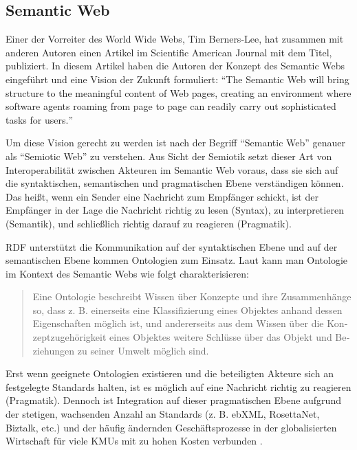 \documentclass[../main.tex]{subfiles}
\begin{document}
\subsection{Semantic Web}
\label{sec:semantic-web}

Einer der Vorreiter des World Wide Webs, Tim Berners-Lee, hat zusammen mit anderen Autoren \citeyear{berners2001semantic} einen Artikel im Scientific American Journal mit dem Titel,  publiziert. In diesem Artikel haben die Autoren der Konzept des Semantic Webs eingeführt und eine Vision der Zukunft formuliert: \hyphenquote{german}{The Semantic Web will bring structure to the meaningful content of Web pages, creating an environment where software agents roaming from page to page can readily carry out sophisticated tasks for users.}

Um diese Vision gerecht zu werden ist nach \citeauthor{blumauer2006semantic} der Begriff \hyphenquote{german}{Semantic Web} genauer als \hyphenquote{german}{Semiotic Web} zu verstehen. Aus Sicht der Semiotik setzt dieser Art von Interoperabilität zwischen Akteuren im Semantic Web voraus, dass sie sich auf die syntaktischen, semantischen und pragmatischen Ebene verständigen können. Das heißt, wenn ein Sender eine Nachricht zum Empfänger schickt, ist der Empfänger in der Lage die Nachricht richtig zu lesen (Syntax), zu interpretieren (Semantik), und schließlich richtig darauf zu reagieren (Pragmatik)\autocite[vgl.]{voigtmann2002enterprise}. 

RDF unterstützt die Kommunikation auf der syntaktischen Ebene und auf der semantischen Ebene kommen Ontologien zum Einsatz. Laut \citeauthor[S.~488]{may2006semantic} kann man Ontologie im Kontext des Semantic Webs wie folgt charakterisieren: \hyphenblockquote{german}{Eine Ontologie beschreibt Wissen über Konzepte und ihre Zusammenhänge so, dass z. B. einerseits eine Klassifizierung eines Objektes anhand dessen Eigenschaften möglich ist, und andererseits aus dem Wissen über die Konzeptzugehörigkeit eines Objektes weitere Schlüsse über das Objekt und Beziehungen zu seiner Umwelt möglich sind.} Erst wenn geeignete Ontologien existieren und die beteiligten Akteure sich an festgelegte Standards halten, ist es möglich auf eine Nachricht richtig zu reagieren (Pragmatik). Dennoch ist Integration auf dieser pragmatischen Ebene aufgrund der stetigen, wachsenden Anzahl an Standards (z. B. ebXML, RosettaNet, Biztalk, etc.) und der häufig ändernden Geschäftsprozesse in der globalisierten Wirtschaft für viele KMUs mit zu hohen Kosten verbunden \autocite[vgl.][S.~4ff]{rebstock2008ontologies}.
\end{document}
